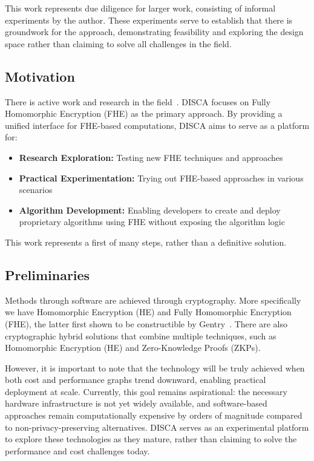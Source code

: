 \documentclass[12pt,a4paper]{article}
\begin{document}
This work represents due diligence for larger work, consisting of informal experiments by the author.
These experiments serve to establish that there is groundwork for the approach, demonstrating feasibility and exploring the design space rather than claiming to solve all challenges in the field.

\subsection{Motivation}

There is active work and research in the field~\cite{zama_fhe,phala_network}.
DISCA focuses on Fully Homomorphic Encryption (FHE) as the primary approach.
By providing a unified interface for FHE-based computations, DISCA aims to serve as a platform for:
\begin{itemize}
    \item \textbf{Research Exploration:} Testing new FHE techniques and approaches
    \item \textbf{Practical Experimentation:} Trying out FHE-based approaches in various scenarios
    \item \textbf{Algorithm Development:} Enabling developers to create and deploy proprietary algorithms using FHE without exposing the algorithm logic
\end{itemize}

This work represents a first of many steps, rather than a definitive solution.

\subsection{Preliminaries}

Methods through software are achieved through cryptography.
More specifically we have Homomorphic Encryption (HE) and Fully Homomorphic Encryption (FHE), the latter first shown to be constructible by Gentry~\cite{homomorphic_encryption}.
There are also cryptographic hybrid solutions that combine multiple techniques, such as Homomorphic Encryption (HE) and Zero-Knowledge Proofs (ZKPs).

However, it is important to note that the technology will be truly achieved when both cost and performance graphs trend downward, enabling practical deployment at scale.
Currently, this goal remains aspirational: the necessary hardware infrastructure is not yet widely available, and software-based approaches remain computationally expensive by orders of magnitude compared to non-privacy-preserving alternatives.
DISCA serves as an experimental platform to explore these technologies as they mature, rather than claiming to solve the performance and cost challenges today.
\end{document}
